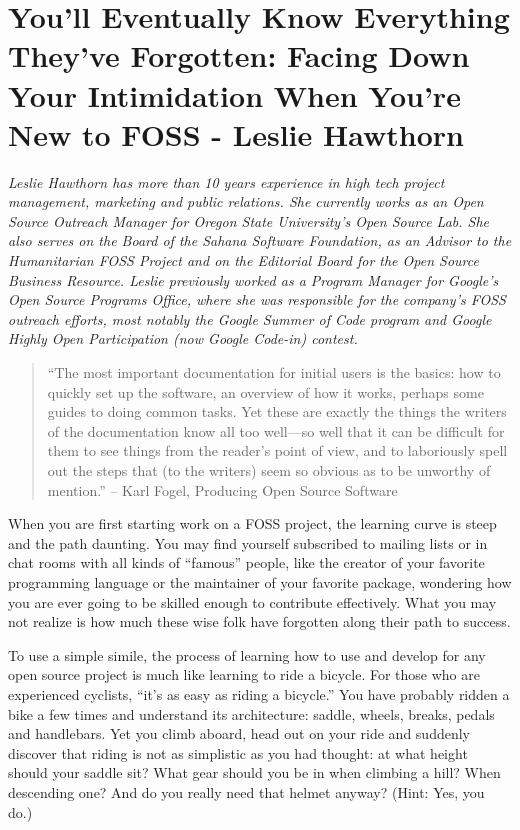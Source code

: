 \chapter{You’ll Eventually Know Everything They’ve Forgotten: Facing Down Your
Intimidation When You’re New to FOSS - Leslie Hawthorn}

\textit{Leslie Hawthorn has more than 10 years experience in high tech project
management, marketing and public relations. She currently works as an Open
Source Outreach Manager for Oregon State University’s Open Source Lab. She also
serves on the Board of the Sahana Software Foundation, as an Advisor to the
Humanitarian FOSS Project and on the Editorial Board for the Open Source
Business Resource. Leslie previously worked as a Program Manager for Google’s
Open Source Programs Office, where she was responsible for the company’s FOSS
outreach efforts, most notably the Google Summer of Code program and Google
Highly Open Participation (now Google Code-in) contest.}

\begin{quote}
``The most important documentation for initial users is the basics: how to
quickly set up the software, an overview of how it works, perhaps some guides to
doing common tasks. Yet these are exactly the things the writers of the
documentation know all too well—so well that it can be difficult for them to see
things from the reader's point of view, and to laboriously spell out the steps
that (to the writers) seem so obvious as to be unworthy of mention.'' -- Karl
Fogel, Producing Open Source Software
\end{quote}

When you are first starting work on a FOSS project, the learning curve is steep
and the path daunting. You may find yourself subscribed to mailing lists or in
chat rooms with all kinds of ``famous'' people, like the creator of your
favorite programming language or the maintainer of your favorite package,
wondering how you are ever going to be skilled enough to contribute effectively.
What you may not realize is how much these wise folk have forgotten along their
path to success.

To use a simple simile, the process of learning how to use and develop for any
open source project is much like learning to ride a bicycle. For those who are
experienced cyclists, ``it’s as easy as riding a bicycle.'' You have probably
ridden a bike a few times and understand its architecture: saddle, wheels,
breaks, pedals and handlebars. Yet you climb aboard, head out on your ride and
suddenly discover that riding is not as simplistic as you had thought: at what
height should your saddle sit? What gear should you be in when climbing a hill?
When descending one? And do you really need that helmet anyway? (Hint: Yes, you
do.) 

